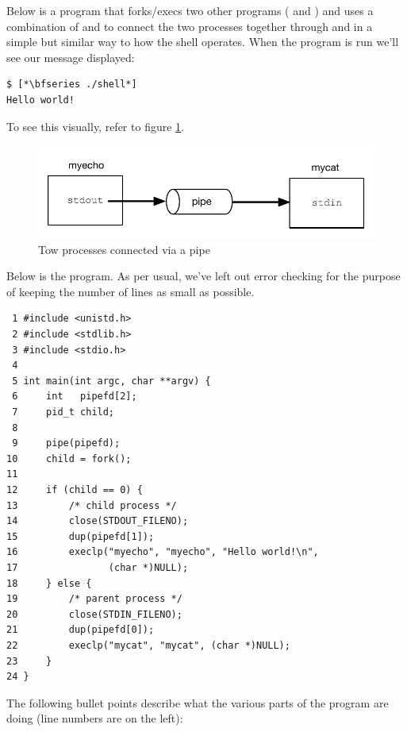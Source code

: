 \noindent
Below is a program that forks/execs two other programs ( and ) and uses a combination of  and  to connect the two processes together through  and  in a simple but similar way to how the shell operates. When the  program is run we'll see our message displayed:

\begin{lstlisting}
$ [*\bfseries ./shell*]
Hello world!
\end{lstlisting}

\noindent
To see this visually, refer to figure \ref{fig:pipe}.

\begin{figure}
	\includegraphics[scale=0.6]{figures/pipe.pdf}
	\centering
	\caption{Tow processes connected via a pipe}
	\label{fig:pipe}
\end{figure}

Below is the  program. As per usual, we've left out error checking for the purpose of keeping the number of lines as small as possible.

\begin{lstlisting}
 1 #include <unistd.h>
 2 #include <stdlib.h>
 3 #include <stdio.h>
 4 
 5 int main(int argc, char **argv) {
 6     int   pipefd[2];
 7     pid_t child;
 8 
 9     pipe(pipefd);
10     child = fork();
11  
12     if (child == 0) {
13         /* child process */
14         close(STDOUT_FILENO);
15         dup(pipefd[1]);
16         execlp("myecho", "myecho", "Hello world!\n",
17                (char *)NULL);
18     } else {
19         /* parent process */
20         close(STDIN_FILENO);
21         dup(pipefd[0]);
22         execlp("mycat", "mycat", (char *)NULL);
23     }
24 }
\end{lstlisting}

\noindent
The following bullet points describe what the various parts of the program are doing (line numbers are on the left):

